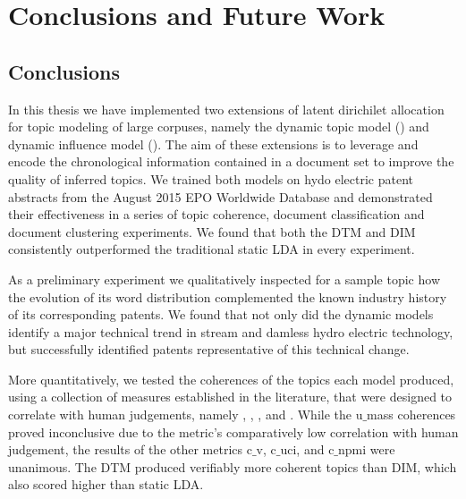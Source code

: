 
\chapter{Conclusions and Future Work} %

\label{Chapter5} %



\section{Conclusions}

In this thesis we have implemented two extensions of latent dirichilet allocation for topic modeling of large corpuses, namely the dynamic topic model () and dynamic influence model (). The aim of these extensions is to leverage and encode the chronological information contained in a document set to improve the quality of inferred topics. We trained both models on hydo electric patent abstracts from the August 2015 EPO Worldwide  Database and demonstrated their effectiveness in a series of topic coherence, document classification and document clustering experiments. We found that both the DTM and DIM consistently outperformed the traditional static LDA in every experiment.

As a preliminary experiment we qualitatively inspected for a sample topic how the evolution of its word distribution complemented the known industry history of its corresponding patents. We found that not only did the dynamic models identify a major technical trend in stream and damless hydro electric technology, but successfully identified patents representative of this technical change. 

More quantitatively, we tested the coherences of the topics each model produced, using a collection of measures established in the literature, that were designed to correlate with human judgements, namely , , , and . While the u$\_$mass coherences proved inconclusive due to the metric's  comparatively low correlation with human judgement, the results of the other metrics c$\_$v, c$\_$uci, and c$\_$npmi were unanimous. The DTM produced verifiably more coherent topics than DIM, which also scored higher than static LDA. 

